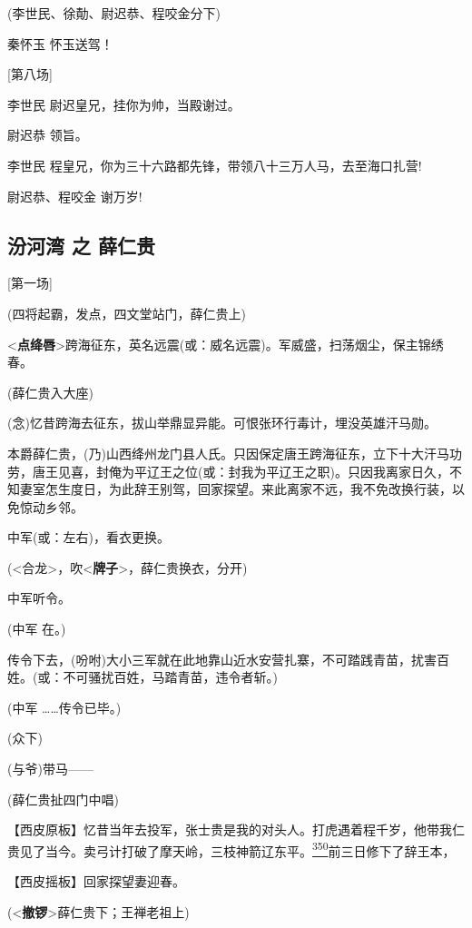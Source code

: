 (李世民、徐勣、尉迟恭、程咬金分下)

秦怀玉 怀玉送驾！

{[}第八场{]}

李世民 尉迟皇兄，挂你为帅，当殿谢过。

尉迟恭 领旨。

李世民 程皇兄，你为三十六路都先锋，带领八十三万人马，去至海口扎营!

尉迟恭、程咬金 谢万岁!

\hypertarget{ux6c7eux6cb3ux6e7e-ux4e4b-ux859bux4ec1ux8d35}{%
\subsection{汾河湾 之
薛仁贵}\label{ux6c7eux6cb3ux6e7e-ux4e4b-ux859bux4ec1ux8d35}}

{[}第一场{]}

(四将起霸，发点，四文堂站门，薛仁贵上)

\textless{}\textbf{点绛唇}\textgreater{}跨海征东，英名远震(或：威名远震)。军威盛，扫荡烟尘，保主锦绣春。

(薛仁贵入大座)

(念)忆昔跨海去征东，拔山举鼎显异能。可恨张环行毒计，埋没英雄汗马勋。

本爵薛仁贵，(乃)山西绛州龙门县人氏。只因保定唐王跨海征东，立下十大汗马功劳，唐王见喜，封俺为平辽王之位(或：封我为平辽王之职)。只因我离家日久，不知妻室怎生度日，为此辞王别驾，回家探望。来此离家不远，我不免改换行装，以免惊动乡邻。

中军(或：左右)，看衣更换。

(\textless{}合龙\textgreater{}，吹\textless{}\textbf{牌子}\textgreater{}，薛仁贵换衣，分开)

中军听令。

(中军 在。)

传令下去，(吩咐)大小三军就在此地靠山近水安营扎寨，不可踏践青苗，扰害百姓。(或：不可骚扰百姓，马踏青苗，违令者斩。)

(中军 \ldots{}\ldots{}传令已毕。)

(众下)

(与爷)带马------

(薛仁贵扯四门中唱)

【西皮原板】忆昔当年去投军，张士贵是我的对头人。打虎遇着程千岁，他带我仁贵见了当今。卖弓计打破了摩天岭，三枝神箭辽东平。\protect\hyperlink{fn350}{\textsuperscript{350}}前三日修下了辞王本，

【西皮摇板】回家探望妻迎春。

(\textless{}\textbf{撤锣}\textgreater{}薛仁贵下；王禅老祖上)

